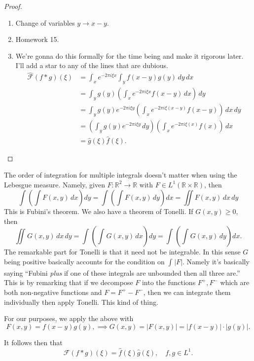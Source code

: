 \begin{proof}
	\begin{enumerate}
	
		\item Change of variables \( y \to x - y \).
		\item Homework 15.
		\item We're gonna do this formally for the time being and make it rigorous later. I'll add a star to any of the lines that are dubious.
			\begin{align*}
				\hat {\mathcal{F}}(f * g)(\xi) &= \int_{x} e^{-2 \pi i \xi x} \int_{y} f(x-y)g(y) \, dy \, dx \\
				\tag{\( * \)}&= \int_{y} g(y) \left( \int_{x} e^{-2 \pi i \xi x}f(x-y) \, dx \right) \, dy \\
										 &= \int_{y} g(y) e^{-2 \pi i \xi y} \left( \int_{x} e^{-2 \pi i \xi (x-y)} f(x-y) \right) \, dx \, dy \\
										 &= \left( \int_{y} g(y) e^{-2 \pi i \xi y}  \, dy \right) \left( \int_{x} e^{-2 \pi i \xi (x)} f(x) \right) \, dx \\
										 &= \hat g(\xi) \hat f(\xi).
			\end{align*}
	\end{enumerate}
\end{proof}

\begin{remark}
	The order of integration for multiple integrals doesn't matter when using the Lebesgue measure. Namely, given \( F \colon \mathbb{R}^{2} \to \mathbb{R} \) with \( F \in L^{1}(\mathbb{R} \times \mathbb{R}) \), then
	\[ \int \left( \int F(x, y) \, dx \right) dy = \int \left( \int F(x, y) \, dy \right)  dx = \iint F(x, y) \, dx \, dy  \]
	This is Fubini's theorem. We also have a theorem of Tonelli. If \( G(x, y) \ge 0 \), then
	\[ \iint_{} G(x, y) \, dx \, dy = \int_{} \left( \int_{} G(x, y) \, dx \right) dy = \int_{} \left( \int_{} G(x, y)\, dy \right) dx. \]
	The remarkable part for Tonelli is that it need not be integrable. In this sense \( G \) being positive basically accounts for the condition on \( \int_{} |F| \). Namely it's basically saying ``Fubini \textit{plus} if one of these integrals are unbounded then all three are.'' This is by remarking that if we decompose \( F \) into the functions \( F^{+}, F^{-} \) which are both non-negative functions and \( F = F^{+}-F^{-} \), then we can integrate them individually then apply Tonelli. This kind of thing.

	For our purposes, we apply the above with
	\[ F(x, y) = f(x-y)g(y), \implies G(x, y) = |F(x, y)| = |f(x-y)| \cdot |g(y)|. \]
\end{remark}
It follows then that
\[ \hat {\mathcal{F}}(f * g)(\xi) = \hat f(\xi) \hat g(\xi), \quad f, g \in L^{1}. \]

